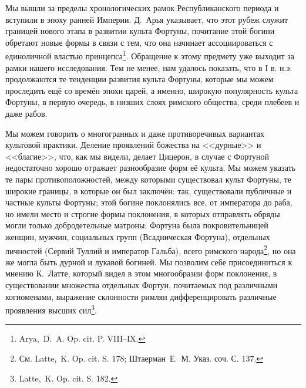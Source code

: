 Мы вышли за пределы хронологических рамок Республиканского периода и вступили в эпоху ранней Империи. Д.~Арья указывает, что этот рубеж служит границей нового этапа в развитии культа Фортуны, почитание этой богини обретают новые формы в связи с тем, что она начинает ассоциироваться с единоличной властью принцепса\footnote{Arya,~D.~A. Op. cit. P. VIII--IX.}. Обращение к этому предмету уже выходит за рамки нашего исследования. Тем не менее, нам удалось показать, что в I в. н.э. продолжаются те тенденции развития культа Фортуны, которые мы можем проследить ещё со времён эпохи царей, а именно, широкую популярность культа Фортуны, в первую очередь, в низших слоях римского общества, среди плебеев и даже рабов.

Мы можем говорить о многогранных и даже противоречивых вариантах культовой практики. Деление проявлений божества на <<дурные>> и <<благие>>, что, как мы видели, делает Цицерон, в случае с Фортуной недостаточно хорошо отражает разнообразие форм её культа. Мы можем указать те пары противоположностей, между которыми существовал культ Фортуны, те широкие границы, в которые он был заключён: так, существовали публичные и частные культы Фортуны; этой богине поклонялись все, от императора до раба, но имели место и строгие формы поклонения, в которых отправлять обряды могли только добродетельные матроны; Фортуна была покровительницей женщин, мужчин, социальных групп (Всадническая Фортуна), отдельных личностей (Сервий Туллий и император Гальба), всего римского народа\footnote{См. Latte,~K. Op. cit. S. 178; Штаерман~Е.~М. Указ. соч. С. 137.}, но она же могла быть дурной и лукавой богиней. Мы позволим себе присоединиться к мнению К.~Латте, который видел в этом многообразии форм поклонения, в существовании множества отдельных Фортун, почитаемых под различными когноменами, выражение склонности римлян дифференцировать различные проявления высших сил\footnote{Latte,~K. Op. cit. S. 182.}. 





